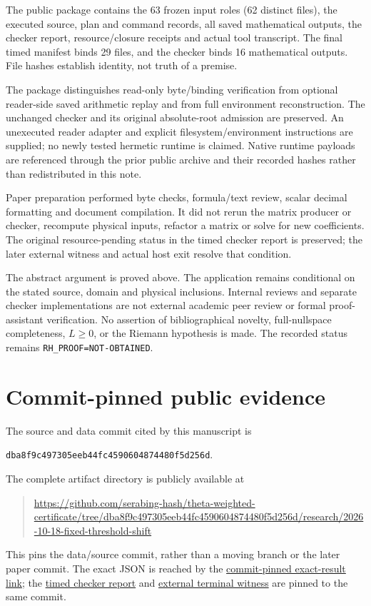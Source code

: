 \documentclass[11pt,a4paper]{article}
\newcommand{\ArtifactCommit}{dba8f9c497305eeb44fc4590604874480f5d256d}
\newcommand{\ArtifactURL}{https://github.com/serabing-hash/theta-weighted-certificate/tree/\ArtifactCommit/research/2026-10-18-fixed-threshold-shift}
\theoremstyle{definition}
\theoremstyle{remark}
\numberwithin{equation}{section}
\begin{document}
The public package contains the 63 frozen input roles (62 distinct files),
the executed source, plan and command records, all saved mathematical
outputs, the checker report, resource/closure receipts and actual tool
transcript. The final timed manifest binds 29 files, and the checker binds
16 mathematical outputs. File hashes establish identity, not truth of a
premise.

The package distinguishes read-only byte/binding verification from optional
reader-side saved arithmetic replay and from full environment reconstruction.
The unchanged checker and its original absolute-root admission are preserved.
An unexecuted reader adapter and explicit filesystem/environment instructions
are supplied; no newly tested hermetic runtime is claimed. Native runtime
payloads are referenced through the prior public archive and their recorded
hashes rather than redistributed in this note.

Paper preparation performed byte checks, formula/text review, scalar decimal
formatting and document compilation. It did not rerun the matrix producer
or checker, recompute physical inputs, refactor a matrix or solve for new
coefficients. The original resource-pending status in the timed checker
report is preserved; the later external witness and actual host exit resolve
that condition.

The abstract argument is proved above. The application remains conditional
on the stated source, domain and physical inclusions. Internal reviews and
separate checker implementations are not external academic peer review or
formal proof-assistant verification. No assertion of bibliographical novelty,
full-nullspace completeness, \(L\ge0\), or the Riemann hypothesis is made.
The recorded status remains \texttt{RH\_PROOF=NOT-OBTAINED}.

\appendix
\section{Commit-pinned public evidence}\label{app:artifact}

The source and data commit cited by this manuscript is
\begin{center}
\small\texttt{\ArtifactCommit}.
\end{center}
The complete artifact directory is publicly available at
\begin{quote}\small
\edef\PinnedArtifactURL{\ArtifactURL}\expandafter\url\expandafter{\PinnedArtifactURL}
\end{quote}
This pins the data/source commit, rather than a moving branch or the later
paper commit. The exact JSON is reached by the
\href{https://github.com/serabing-hash/theta-weighted-certificate/blob/\ArtifactCommit/research/2026-10-18-fixed-threshold-shift/EXACT_RESULT_VALUES.json}{commit-pinned exact-result link};
the
\href{https://github.com/serabing-hash/theta-weighted-certificate/blob/\ArtifactCommit/research/2026-10-18-fixed-threshold-shift/evidence/timed/math/INDEPENDENT_CHECK.json}{timed checker report}
and
\href{https://github.com/serabing-hash/theta-weighted-certificate/blob/\ArtifactCommit/research/2026-10-18-fixed-threshold-shift/evidence/host/EXTERNAL_TERMINAL_WITNESS.json}{external terminal witness}
are pinned to the same commit.
\end{document}
